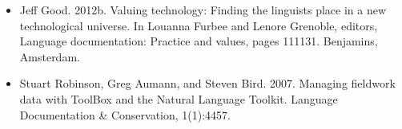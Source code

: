 \documentclass{beamer}
\begin{document}
\begin{frame}
\begin{itemize}
  \item Jeff Good. 2012b. Valuing technology: Finding the linguists place in a new technological universe. In Louanna Furbee and Lenore Grenoble, editors, Language documentation: Practice and values, pages 111131. Benjamins, Amsterdam.
  \item Stuart Robinson, Greg Aumann, and Steven Bird. 2007. Managing fieldwork data with ToolBox and the Natural Language Toolkit. Language Documentation \& Conservation, 1(1):4457.

\end{itemize}
\end{frame}
\end{document}
